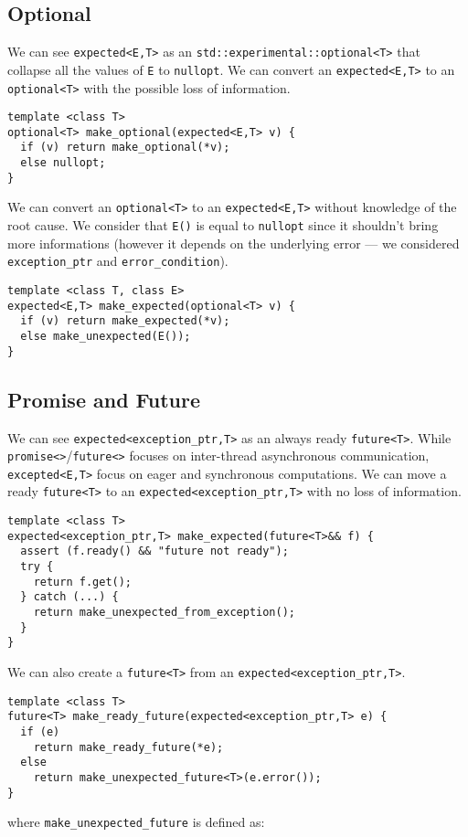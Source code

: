 \documentclass[a4paper,10pt]{article}
\newcommand{\cpp}[1]{\lstinline{#1}}
\begin{document}
\subsection{Optional}

We can see \cpp{expected<E,T>} as an \cpp{std::experimental::optional<T>} that collapse all the values of \cpp{E} to \cpp{nullopt}. We can convert an \cpp{expected<E,T>} to an \cpp{optional<T>} with the possible loss of information.

\begin{lstlisting}
template <class T>
optional<T> make_optional(expected<E,T> v) {
  if (v) return make_optional(*v);
  else nullopt;
}
\end{lstlisting}
\noindent
We can convert an \cpp{optional<T>} to an \cpp{expected<E,T>} without knowledge of the root cause. We consider that \cpp{E()} is equal to \cpp{nullopt} since it shouldn't bring more informations (however it depends on the underlying error --- we considered \cpp{exception_ptr} and \cpp{error_condition}).

\begin{lstlisting}
template <class T, class E>
expected<E,T> make_expected(optional<T> v) {
  if (v) return make_expected(*v);
  else make_unexpected(E());
}
\end{lstlisting}

\subsection{Promise and Future}

We can see \cpp{expected<exception_ptr,T>} as an always ready \cpp{future<T>}. While \cpp{promise<>}/\cpp{future<>} focuses on inter-thread asynchronous communication, \cpp{excepted<E,T>} focus on eager and synchronous computations.
We can move a ready \cpp{future<T>} to an \cpp{expected<exception_ptr,T>} with no loss of information. 

\begin{lstlisting}
template <class T>
expected<exception_ptr,T> make_expected(future<T>&& f) {
  assert (f.ready() && "future not ready");
  try {
    return f.get();
  } catch (...) {
    return make_unexpected_from_exception();
  }
}
\end{lstlisting}
\noindent
We can also create a \cpp{future<T>} from an \cpp{expected<exception_ptr,T>}.

\begin{lstlisting}
template <class T>
future<T> make_ready_future(expected<exception_ptr,T> e) {
  if (e) 
    return make_ready_future(*e);
  else 
    return make_unexpected_future<T>(e.error()); 
}
\end{lstlisting}
\noindent
where \cpp{make_unexpected_future} is defined as:
\end{document}
